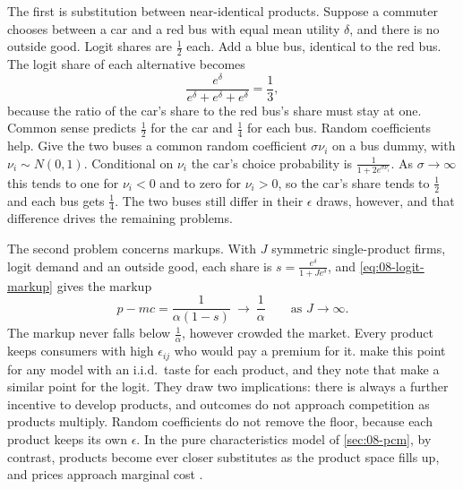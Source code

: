 The first is substitution between near-identical products. Suppose a commuter chooses between a car and a red bus with
equal mean utility $\delta$, and there is no outside good. Logit shares are $\frac{1}{2}$ each. Add a blue bus,
identical to the red bus. The logit share of each alternative becomes
\begin{equation*}
  \frac{e^{\delta}}{e^{\delta} + e^{\delta} + e^{\delta}} = \frac{1}{3},
\end{equation*}
because the ratio of the car's share to the red bus's share must stay at one. Common sense predicts $\frac{1}{2}$ for
the car and $\frac{1}{4}$ for each bus. Random coefficients help. Give the two buses a common random coefficient
$\sigma\nu_i$ on a bus dummy, with $\nu_i \sim N(0, 1)$. Conditional on $\nu_i$ the car's choice probability is
$\frac{1}{1 + 2e^{\sigma\nu_i}}$. As $\sigma \to \infty$ this tends to one for $\nu_i < 0$ and to zero for $\nu_i > 0$,
so the car's share tends to $\frac{1}{2}$ and each bus gets $\frac{1}{4}$. The two buses still differ in their
$\epsilon$ draws, however, and that difference drives the remaining problems.

The second problem concerns markups. With $J$ symmetric single-product firms, logit demand and an outside good, each
share is $s = \frac{e^{\delta}}{1 + Je^{\delta}}$, and \eqref{eq:08-logit-markup} gives the markup
\begin{equation*}
  p - mc = \frac{1}{\alpha(1 - s)} \ \longrightarrow\ \frac{1}{\alpha} \qquad\text{as } J \to \infty .
\end{equation*}
The markup never falls below $\frac{1}{\alpha}$, however crowded the market. Every product keeps consumers with high
$\epsilon_{ij}$ who would pay a premium for it. \citet[Section~2]{BerryPakes2007} make this point for any model with
an i.i.d.\ taste for each product, and they note that \citet{AndersonDePalmaThisse1992} make a similar point for the
logit. They draw two implications: there is always a further incentive to develop products, and outcomes do not approach
competition as products multiply. Random coefficients do not remove the floor, because each product keeps its own
$\epsilon$. In the pure characteristics model of \cref{sec:08-pcm}, by contrast, products become ever closer
substitutes as the product space fills up, and prices approach marginal cost \citep[Section~2]{BerryPakes2007}.

